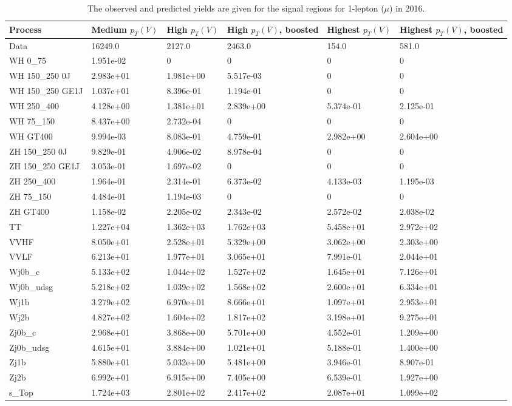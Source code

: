 \begin{table}
\centering
\caption[2016 1-lepton ($\mu$) signal selection yields]{
                  The observed and predicted yields are given for the
                  signal regions for 1-lepton ($\mu$) in 2016.
                  }
{\footnotesize
\begin{tabularx}{\textwidth}{|X|X|X|X|X|X|}
\hline
Process & Medium $p_{T}(V)$ & High $p_{T}(V)$ & High $p_{T}(V)$, boosted & Highest $p_{T}(V)$ & Highest $p_{T}(V)$, boosted \\
\hline
Data & 16249.0 & 2127.0 & 2463.0 & 154.0 & 581.0 \\
\hline
WH 0\_75 & 1.951e-02 & 0 & 0 & 0 & 0 \\
WH 150\_250 0J & 2.983e+01 & 1.981e+00 & 5.517e-03 & 0 & 0 \\
WH 150\_250 GE1J & 1.037e+01 & 8.396e-01 & 1.194e-01 & 0 & 0 \\
WH 250\_400 & 4.128e+00 & 1.381e+01 & 2.839e+00 & 5.374e-01 & 2.125e-01 \\
WH 75\_150 & 8.437e+00 & 2.732e-04 & 0 & 0 & 0 \\
WH GT400 & 9.994e-03 & 8.083e-01 & 4.759e-01 & 2.982e+00 & 2.604e+00 \\
ZH 150\_250 0J & 9.829e-01 & 4.906e-02 & 8.978e-04 & 0 & 0 \\
ZH 150\_250 GE1J & 3.053e-01 & 1.697e-02 & 0 & 0 & 0 \\
ZH 250\_400 & 1.964e-01 & 2.314e-01 & 6.373e-02 & 4.133e-03 & 1.195e-03 \\
ZH 75\_150 & 4.484e-01 & 1.194e-03 & 0 & 0 & 0 \\
ZH GT400 & 1.158e-02 & 2.205e-02 & 2.343e-02 & 2.572e-02 & 2.038e-02 \\
\hline
TT & 1.227e+04 & 1.362e+03 & 1.762e+03 & 5.458e+01 & 2.972e+02 \\
VVHF & 8.050e+01 & 2.528e+01 & 5.329e+00 & 3.062e+00 & 2.303e+00 \\
VVLF & 6.213e+01 & 1.977e+01 & 3.065e+01 & 7.991e-01 & 2.044e+01 \\
Wj0b\_c & 5.133e+02 & 1.044e+02 & 1.527e+02 & 1.645e+01 & 7.126e+01 \\
Wj0b\_udsg & 5.218e+02 & 1.039e+02 & 1.568e+02 & 2.600e+01 & 6.334e+01 \\
Wj1b & 3.279e+02 & 6.970e+01 & 8.666e+01 & 1.097e+01 & 2.953e+01 \\
Wj2b & 4.827e+02 & 1.604e+02 & 1.817e+02 & 3.198e+01 & 9.275e+01 \\
Zj0b\_c & 2.968e+01 & 3.868e+00 & 5.701e+00 & 4.552e-01 & 1.209e+00 \\
Zj0b\_udsg & 4.615e+01 & 3.884e+00 & 1.021e+01 & 5.188e-01 & 1.400e+00 \\
Zj1b & 5.880e+01 & 5.032e+00 & 5.481e+00 & 3.946e-01 & 8.907e-01 \\
Zj2b & 6.992e+01 & 6.915e+00 & 7.405e+00 & 6.539e-01 & 1.927e+00 \\
s\_Top & 1.724e+03 & 2.801e+02 & 2.417e+02 & 2.087e+01 & 1.099e+02 \\
\hline
\end{tabularx}
}
\label{tab:sr-Wmn-2016}
\end{table}

